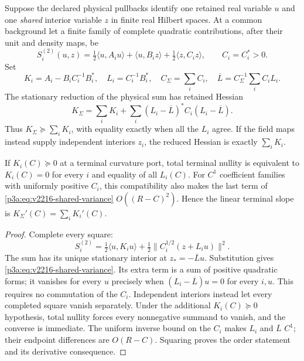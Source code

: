 \documentclass[12pt,a4paper]{article}
\begin{document}
\begin{theorem}
\label{p3a:thm:v2216-common-action-consumption}
Suppose the declared physical pullbacks identify one retained real variable
$u$ and one \emph{shared} interior variable $z$ in finite real Hilbert spaces.
At a common background let a finite family of complete quadratic contributions,
after their unit and density maps, be
\[
 S_i^{(2)}(u,z)=\tfrac12\langle u,A_i u\rangle+
 \langle u,B_i z\rangle+\tfrac12\langle z,C_i z\rangle,
 \qquad C_i=C_i^*>0.
\]
Set
\[
 K_i=A_i-B_iC_i^{-1}B_i^*,\quad L_i=C_i^{-1}B_i^*,\quad
 C_\Sigma=\sum_iC_i,\quad
 \overline L=C_\Sigma^{-1}\sum_iC_iL_i.
\]
The stationary reduction of the physical sum has retained Hessian
\begin{equation}
 \boxed{K_\Sigma=\sum_iK_i+
 \sum_i(L_i-\overline L)^*C_i(L_i-\overline L).}
 \label{p3a:eq:v2216-shared-variance}
\end{equation}
Thus $K_\Sigma\succeq\sum_iK_i$, with equality exactly when all the
$L_i$ agree. If the field maps instead supply independent interiors $z_i$,
the reduced Hessian is exactly $\sum_iK_i$.

If $K_i(C)\succeq0$ at a terminal curvature port, total terminal nullity is
equivalent to $K_i(C)=0$ for every $i$ and equality of all $L_i(C)$. For
$C^1$ coefficient families with uniformly positive $C_i$, this compatibility
also makes the last term of \eqref{p3a:eq:v2216-shared-variance}
$O((R-C)^2)$. Hence the linear terminal slope is
$K_\Sigma'(C)=\sum_iK_i'(C)$.
\end{theorem}
\begin{proof}
Complete every square:
\[
 S_i^{(2)}=\tfrac12\langle u,K_i u\rangle+
       \tfrac12\|C_i^{1/2}(z+L_i u)\|^2.
\]
The sum has its unique stationary interior at
$z_*=-\overline L u$. Substitution gives
\eqref{p3a:eq:v2216-shared-variance}. Its extra term is a sum of positive
quadratic forms; it vanishes for every $u$ precisely when
$(L_i-\overline L)u=0$ for every $i,u$. This requires no commutation of the
$C_i$. Independent interiors instead let every completed square vanish
separately. Under the additional $K_i(C)\succeq0$ hypothesis, total nullity
forces every nonnegative summand to vanish, and the converse is immediate.
The uniform inverse bound on the $C_i$ makes $L_i$ and $\overline L$ $C^1$;
their endpoint differences are $O(R-C)$. Squaring proves the order statement
and its derivative consequence.
\end{proof}
\end{document}
